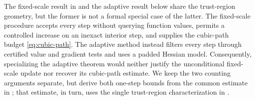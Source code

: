 \documentclass{article}
\begin{document}
\begin{remark}
\label{rem:fixed-not-adaptive-special-case}
The fixed-scale result in  and the adaptive result
below share the trust-region geometry, but the former is not a formal
special case of the latter.  The fixed-scale procedure accepts every
step without querying function values, permits a controlled increase
on an inexact interior step, and supplies the cubic-path budget
\eqref{eq:cubic-path}.  The adaptive method instead filters every step
through certified value and gradient tests and uses a padded Hessian
model.  Consequently, specializing the adaptive theorem would neither
justify the unconditional fixed-scale update nor recover its
cubic-path estimate.  We keep the two counting arguments separate,
but derive both one-step bounds from the common estimate in
; that estimate, in turn, uses the
single trust-region characterization in
.
\end{remark}
\end{document}
